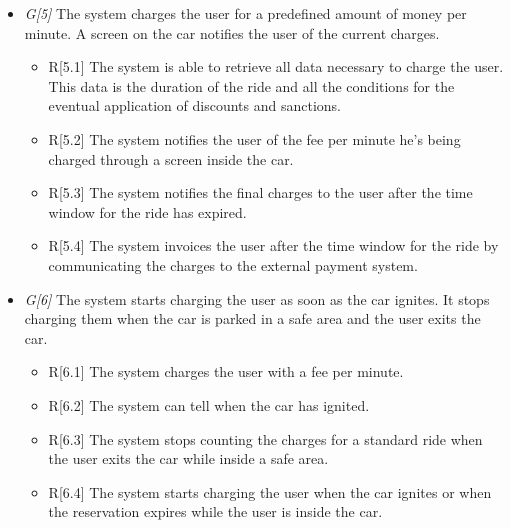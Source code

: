 \begin{itemize}
				\item \textit{G[5]} The system charges the user for a predefined amount of money per minute. A screen on the car notifies the user of the current charges.
					\begin{itemize}
						\item R[5.1] The system is able to retrieve all data necessary to charge the user. This data is the duration of the ride and all the conditions for the eventual application of discounts and sanctions.
						\item R[5.2] The system notifies the user of the fee per minute he's being charged through a screen inside the car.
						\item R[5.3] The system notifies the final charges to the user after the time window for the ride has expired.
						\item R[5.4] The system invoices the user after the time window for the ride by communicating the charges to the external payment system. 
						
					\end{itemize}
				
				\item \textit{G[6]} The system starts charging the user as soon as the car ignites. It stops charging them when the car is parked in a safe area and the user exits the car.
					\begin{itemize}
						\item R[6.1] The system charges the user with a fee per minute.
						\item R[6.2] The system can tell when the car has ignited. 
						\item R[6.3] The system stops counting the charges for a standard ride when the user exits the car while inside a safe area.
						\item R[6.4] The system starts charging the user when the car ignites or when the reservation expires while the user is inside the car.
					\end{itemize}
					

\end{itemize}
